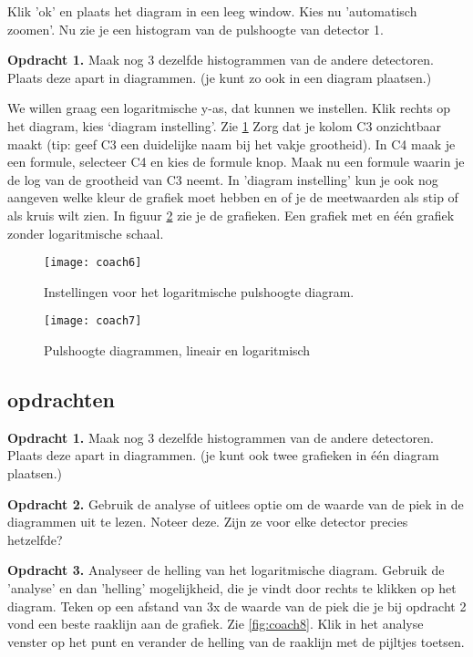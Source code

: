 Klik 'ok' en plaats het diagram in een leeg window. Kies nu 'automatisch zoomen'.
Nu zie je een histogram van de pulshoogte van detector 1.

\textbf{Opdracht 1.}
Maak nog 3 dezelfde histogrammen van de andere detectoren. Plaats deze apart in diagrammen.
(je kunt zo ook in een diagram plaatsen.)

We willen graag een logaritmische y-as, dat kunnen we instellen.
Klik rechts op het diagram, kies `diagram instelling'. Zie \ref{fig:coach6}
Zorg dat je kolom C3 onzichtbaar maakt (tip: geef C3 een duidelijke naam bij het vakje
grootheid). In C4 maak je een formule, selecteer C4 en kies de formule knop. 
Maak nu een formule waarin je de log van de grootheid van C3 neemt. 
In 'diagram instelling' kun je ook nog aangeven welke kleur de grafiek moet hebben en
of je de meetwaarden als stip of als kruis wilt zien. In figuur \ref{fig:coach7} zie je 
de grafieken. Een grafiek met en één grafiek zonder logaritmische schaal.


\begin{figure}
    \centering
    \texttt{[image: coach6]}
    \caption{Instellingen voor het logaritmische pulshoogte diagram.}
    \label{fig:coach6}
\end{figure}

\begin{figure}
    \centering
    \texttt{[image: coach7]}
    \caption{Pulshoogte diagrammen, lineair en logaritmisch}
    \label{fig:coach7}
\end{figure}
 
 
\subsection{opdrachten} 

\textbf{Opdracht 1.}
Maak nog 3 dezelfde histogrammen van de andere detectoren. Plaats deze apart in diagrammen.
(je kunt ook twee grafieken in één diagram plaatsen.)

\textbf{Opdracht 2.}
Gebruik de analyse of uitlees optie om de waarde van de piek in de diagrammen
uit te lezen. Noteer deze. Zijn ze voor elke detector precies hetzelfde?

\textbf{Opdracht 3.}
Analyseer de helling van het logaritmische diagram. Gebruik de 'analyse' en dan 'helling'
mogelijkheid, die je vindt door rechts te klikken op het diagram. 
Teken op een afstand van 3x de waarde van de piek die je bij opdracht 2 vond een beste raaklijn aan de
grafiek. Zie \ref{fig:coach8}. Klik in het analyse venster op het punt en verander
de helling van de raaklijn met de pijltjes toetsen.

